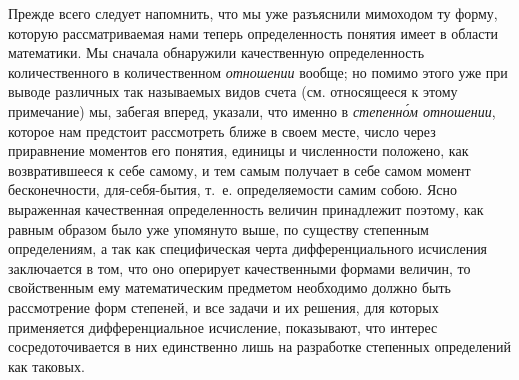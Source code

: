 Прежде всего следует напомнить, что мы уже разъяснили мимоходом ту форму,
которую рассматриваемая нами теперь определенность понятия имеет в области
математики. Мы сначала обнаружили качественную определенность
количественного в количественном {\em отношении}
вообще; но помимо этого уже при выводе различных так называемых видов счета
(см. относящееся к этому примечание) мы, забегая вперед, указали, что
именно в {\em степенн\'{о}м отношении}, которое нам
предстоит рассмотреть ближе в своем месте, число через приравнение моментов
его понятия, единицы и численности положено, как возвратившееся к себе
самому, и тем самым получает в себе самом момент бесконечности,
для-себя-бытия, т.~е. определяемости самим собою. Ясно выраженная
качественная определенность величин принадлежит поэтому, как равным образом
было уже упомянуто выше, по существу степенным определениям, а так как
специфическая черта дифференциального исчисления заключается в том, что оно
оперирует качественными формами величин, то свойственным ему математическим
предметом необходимо должно быть рассмотрение форм степеней, и все задачи и
их решения, для которых применяется дифференциальное исчисление, показывают,
что интерес сосредоточивается в них единственно лишь на разработке
степенных определений как таковых.

